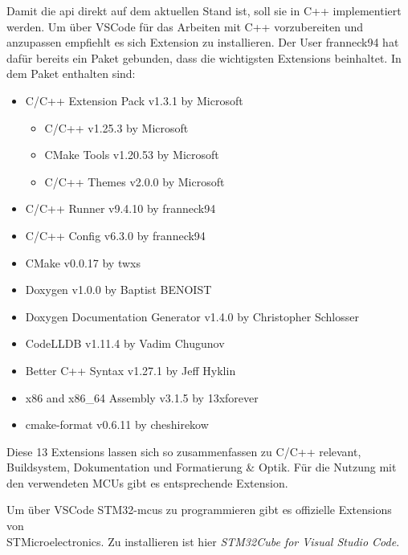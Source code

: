 Damit die \gls{api} direkt auf dem aktuellen Stand ist, soll sie in C++ implementiert werden.
Um über VSCode für das Arbeiten mit C++ vorzubereiten und anzupassen empfiehlt es sich Extension zu installieren.
Der User franneck94 hat dafür bereits ein Paket gebunden, dass die wichtigsten Extensions beinhaltet.
In dem Paket enthalten sind:
\begin{itemize}
	\item C/C++ Extension Pack  v1.3.1 by Microsoft
	\begin{itemize}
		\item C/C++  v1.25.3  by Microsoft		
		\item CMake Tools  v1.20.53  by Microsoft
		\item C/C++ Themes  v2.0.0 by Microsoft 
	\end{itemize}
	\item C/C++ Runner  v9.4.10 by franneck94
	\item C/C++ Config  v6.3.0 by franneck94
	\item CMake  v0.0.17 by twxs
	\item Doxygen  v1.0.0 by Baptist BENOIST
	\item Doxygen Documentation Generator  v1.4.0 by Christopher Schlosser
	\item CodeLLDB  v1.11.4 by Vadim Chugunov
	\item Better C++ Syntax  v1.27.1  by Jeff Hyklin
	\item x86 and x86\_64 Assembly  v3.1.5 by 13xforever
	\item cmake-format  v0.6.11 by cheshirekow
\end{itemize}

Diese 13 Extensions lassen sich so zusammenfassen
zu C/C++ relevant, Buildsystem, Dokumentation und Formatierung \& Optik.
Für die Nutzung mit den verwendeten MCUs gibt es entsprechende Extension.

Um über VSCode STM32-\gls{mcu}s zu programmieren gibt es offizielle Extensions von \\STMicroelectronics.
Zu installieren ist hier \emph{STM32Cube for Visual Studio Code}.

